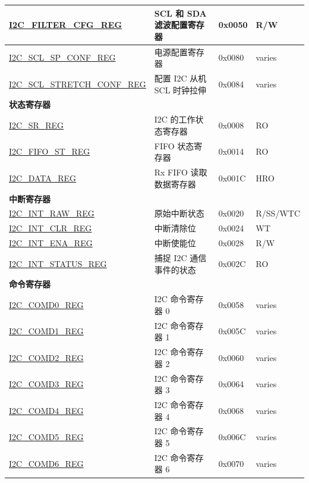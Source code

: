 \begin{longtable}{ | p{6cm} | p{7cm} | p{1.3cm} | p{1cm} | }
    \hyperref[regdesc:I2CFILTERCFGREG]{I2C\_FILTER\_CFG\_REG} & SCL 和 SDA 滤波配置寄存器 & 0x0050 & R/W \\ \hline
    \hyperref[regdesc:I2CSCLSPCONFREG]{I2C\_SCL\_SP\_CONF\_REG} & 电源配置寄存器 & 0x0080 & varies \\ \hline
    \hyperref[regdesc:I2CSCLSTRETCHCONFREG]{I2C\_SCL\_STRETCH\_CONF\_REG} & 配置 I2C 从机 SCL 时钟拉伸 & 0x0084 & varies \\ \hline
    \multicolumn{4}{|l|}{\textbf{状态寄存器}} \\ \hline
    \hyperref[regdesc:I2CSRREG]{I2C\_SR\_REG} & I2C 的工作状态寄存器 & 0x0008 & RO \\ \hline
    \hyperref[regdesc:I2CFIFOSTREG]{I2C\_FIFO\_ST\_REG} & FIFO 状态寄存器 & 0x0014 & RO \\ \hline
    \hyperref[regdesc:I2CDATAREG]{I2C\_DATA\_REG} & Rx FIFO 读取数据寄存器 & 0x001C & HRO \\ \hline
    \multicolumn{4}{|l|}{\textbf{中断寄存器}} \\ \hline
    \hyperref[regdesc:I2CINTRAWREG]{I2C\_INT\_RAW\_REG} & 原始中断状态 & 0x0020 & R/SS/WTC \\ \hline
    \hyperref[regdesc:I2CINTCLRREG]{I2C\_INT\_CLR\_REG} & 中断清除位 & 0x0024 & WT \\ \hline
    \hyperref[regdesc:I2CINTENAREG]{I2C\_INT\_ENA\_REG} & 中断使能位 & 0x0028 & R/W \\ \hline
    \hyperref[regdesc:I2CINTSTATUSREG]{I2C\_INT\_STATUS\_REG} & 捕捉 I2C 通信事件的状态 & 0x002C & RO \\ \hline
    \multicolumn{4}{|l|}{\textbf{命令寄存器}} \\ \hline
    \hyperref[regdesc:I2CCOMD0REG]{I2C\_COMD0\_REG} & I2C 命令寄存器 0 & 0x0058 & varies \\ \hline
    \hyperref[regdesc:I2CCOMD1REG]{I2C\_COMD1\_REG} & I2C 命令寄存器 1 & 0x005C & varies \\ \hline
    \hyperref[regdesc:I2CCOMD2REG]{I2C\_COMD2\_REG} & I2C 命令寄存器 2 & 0x0060 & varies \\ \hline
    \hyperref[regdesc:I2CCOMD3REG]{I2C\_COMD3\_REG} & I2C 命令寄存器 3 & 0x0064 & varies \\ \hline
    \hyperref[regdesc:I2CCOMD4REG]{I2C\_COMD4\_REG} & I2C 命令寄存器 4 & 0x0068 & varies \\ \hline
    \hyperref[regdesc:I2CCOMD5REG]{I2C\_COMD5\_REG} & I2C 命令寄存器 5 & 0x006C & varies \\ \hline
    \hyperref[regdesc:I2CCOMD6REG]{I2C\_COMD6\_REG} & I2C 命令寄存器 6 & 0x0070 & varies \\ \hline

\end{longtable}
